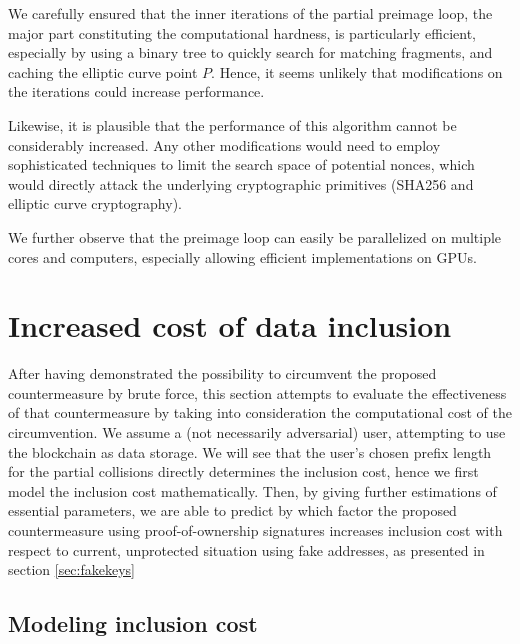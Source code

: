 \documentclass[a4paper,11pt,titlepage]{scrbook}
\begin{document}
We carefully ensured that the inner iterations of the partial preimage loop, the major part constituting the computational hardness, is particularly efficient, especially by using a binary tree to quickly search for matching fragments, and caching the elliptic curve point $P$.
Hence, it seems unlikely that modifications on the iterations could increase performance.

Likewise, it is plausible that the performance of this algorithm cannot be considerably increased.
Any other modifications would need to employ sophisticated techniques to limit the search space of potential nonces, which would directly attack the underlying cryptographic primitives (SHA256 and elliptic curve cryptography).

We further observe that the preimage loop can easily be parallelized on multiple cores and computers, especially allowing efficient implementations on GPUs.


\chapter{Increased cost of data inclusion}

After having demonstrated the possibility to circumvent the proposed countermeasure by brute force, this section attempts to evaluate the effectiveness of that countermeasure by taking into consideration the computational cost of the circumvention. 
We assume a (not necessarily adversarial) user, attempting to use the blockchain as data storage.
We will see that the user's chosen prefix length for the partial collisions directly determines the inclusion cost, hence we first model the inclusion cost mathematically. Then, by giving further estimations of essential parameters, we are able to predict by which factor the proposed countermeasure using proof-of-ownership signatures increases inclusion cost with respect to current, unprotected situation using fake addresses, as presented in section \ref{sec:fakekeys}

\section{Modeling inclusion cost}
\end{document}
